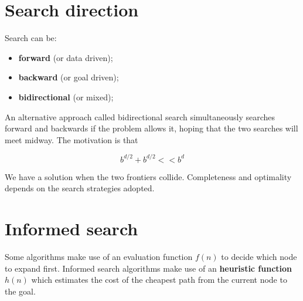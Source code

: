 \documentclass{article}
\begin{document}
\newpage

\section{Search direction}

Search can be:

\begin{itemize}
    \item \textbf{forward} (or data driven);
    \item \textbf{backward} (or goal driven);
    \item \textbf{bidirectional} (or mixed);
\end{itemize}

An alternative approach called bidirectional search simultaneously searches forward and backwards if the problem allows it, hoping that the two searches will meet midway. The motivation is that

\begin{equation}
    b^{d/2} + b^{d/2} << b^d
\end{equation}

\begin{flushleft}
    We have a solution when the two frontiers collide. Completeness and optimality depends on the search strategies adopted.
\end{flushleft}

\newpage

\section{Informed search}

Some algorithms make use of an evaluation function $f(n)$ to decide which node to expand first. Informed search algorithms make use of an \textbf{heuristic function} $h(n)$ which estimates the cost of the cheapest path from the current node to the goal.

\begin{center}
    \begin{figure}[b!]
        \centering
    \end{figure}
\end{center}
\end{document}
